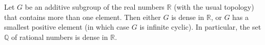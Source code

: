 Let $G$ be an additive subgroup of the real numbers $\mathbb{R}$ (with the usual topology) that contains more than one element. Then either $G$ is dense in $\mathbb{R}$, or $G$ has a smallest positive element (in which case $G$ is infinite cyclic). In particular, the set $\mathbb{Q}$ of rational numbers is dense in $\mathbb{R}$.
